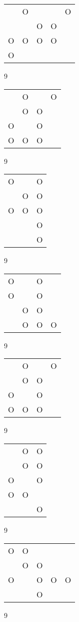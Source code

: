 \begin{tabular}{|m{0.2cm}m{0.2cm}m{0.2cm}m{0.2cm}m{0.2cm}|}\hline
 &O& & &O\\
 & &O&O& \\
O&O&O&O& \\
O& & & & \\
\hline\end{tabular}9
\begin{tabular}{|m{0.2cm}m{0.2cm}m{0.2cm}m{0.2cm}|}\hline
 &O& &O\\
 &O&O& \\
O& &O& \\
O&O&O& \\
\hline\end{tabular}9
\begin{tabular}{|m{0.2cm}m{0.2cm}m{0.2cm}|}\hline
O& &O\\
 &O&O\\
O&O&O\\
 & &O\\
 & &O\\
\hline\end{tabular}9
\begin{tabular}{|m{0.2cm}m{0.2cm}m{0.2cm}m{0.2cm}|}\hline
O& &O& \\
O& &O& \\
 &O&O& \\
 &O&O&O\\
\hline\end{tabular}9
\begin{tabular}{|m{0.2cm}m{0.2cm}m{0.2cm}m{0.2cm}|}\hline
 &O& &O\\
 &O&O& \\
O& &O& \\
O&O&O& \\
\hline\end{tabular}9
\begin{tabular}{|m{0.2cm}m{0.2cm}m{0.2cm}|}\hline
 &O&O\\
 &O&O\\
O& &O\\
O&O& \\
 & &O\\
\hline\end{tabular}9
\begin{tabular}{|m{0.2cm}m{0.2cm}m{0.2cm}m{0.2cm}m{0.2cm}|}\hline
O&O& & & \\
 &O&O& & \\
O& &O&O&O\\
 & &O& & \\
\hline\end{tabular}9
